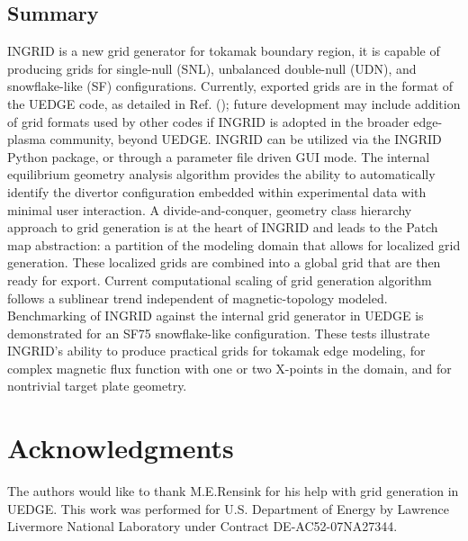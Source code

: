 \subsection{\label{sec:level2}Summary}
INGRID is a new grid generator for tokamak boundary region, it is
capable of producing grids for single-null (SNL), unbalanced
double-null (UDN), and snowflake-like (SF) configurations. Currently,
exported grids are in the format of the UEDGE code, as detailed in
Ref. (\cite{Rensink2017}); future development may include addition of
grid formats used by other codes if INGRID is adopted in the broader
edge-plasma community, beyond UEDGE. INGRID can be utilized via the
INGRID Python package, or through a parameter file driven GUI
mode. The internal equilibrium geometry analysis algorithm provides
the ability to automatically identify the divertor configuration
embedded within experimental data with minimal user interaction. A
divide-and-conquer, geometry class hierarchy approach to grid
generation is at the heart of INGRID and leads to the Patch map
abstraction: a partition of the modeling domain that allows for
localized grid generation. These localized grids are combined into a
global grid that are then ready for export. Current computational
scaling of grid generation algorithm follows a sublinear trend
independent of magnetic-topology modeled. Benchmarking of INGRID
against the internal grid generator in UEDGE is demonstrated for an
SF75 snowflake-like configuration. These tests illustrate INGRID's
ability to produce practical grids for tokamak edge modeling, for
complex magnetic flux function with one or two X-points in the domain,
and for nontrivial target plate geometry.


\section{Acknowledgments}
The authors would like to thank M.E.Rensink for his help with grid
generation in UEDGE. This work was performed for U.S. Department of
Energy by Lawrence Livermore National Laboratory under Contract
DE-AC52-07NA27344.
